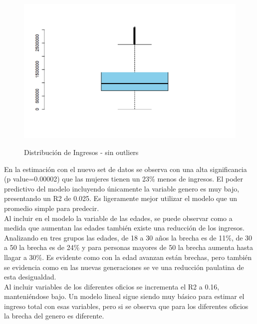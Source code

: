 \documentclass[11pt,a4paper]{article}
\begin{document}
\begin{figure}[H]
    \centering
    \caption{Distribución de Ingresos - sin outliers}
    \includegraphics[width=\textwidth]{../views/ajustado.png}
    \label{fig:ajustado}
\end{figure}

En la estimación con el nuevo set de datos se observa con una alta significancia (p value=0.00002) que las mujeres tienen un 23\% menos de ingresos. El poder predictivo del modelo incluyendo únicamente la variable genero es muy bajo, presentando un R2 de 0.025. Es ligeramente mejor utilizar el modelo que un promedio simple para predecir.\\


Al incluir en el modelo la variable de las edades, se puede observar como a medida que aumentan las edades también existe una reducción de los ingresos. Analizando en tres grupos las edades, de 18 a 30 años la brecha es de 11\%, de 30 a 50 la brecha es de 24\% y para personas mayores de 50 la brecha aumenta hasta llagar a 30\%. Es evidente como con la edad avanzan están brechas, pero también se evidencia como en las nuevas generaciones se ve una reducción paulatina de esta desigualdad.\\


Al incluir variables de los diferentes oficios se incrementa el R2 a 0.16, manteniéndose bajo. Un modelo lineal sigue siendo muy básico para estimar el ingreso total con esas variables, pero si se observa que para los diferentes oficios la brecha del genero es diferente. \\
\end{document}
